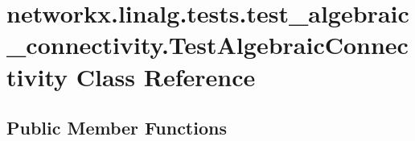 \hypertarget{classnetworkx_1_1linalg_1_1tests_1_1test__algebraic__connectivity_1_1TestAlgebraicConnectivity}{}\section{networkx.\+linalg.\+tests.\+test\+\_\+algebraic\+\_\+connectivity.\+Test\+Algebraic\+Connectivity Class Reference}
\label{classnetworkx_1_1linalg_1_1tests_1_1test__algebraic__connectivity_1_1TestAlgebraicConnectivity}
\subsection*{Public Member Functions}
